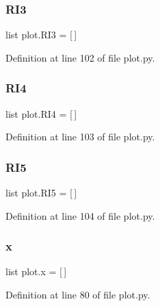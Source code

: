 \subsubsection{R\+I3}
{\footnotesize\ttfamily list plot.\+R\+I3 = [$\,$]}



Definition at line 102 of file plot.\+py.

\mbox{\label{namespaceplot_a668e6067b451a523d880f0be20b5c4a5}} 
\subsubsection{R\+I4}
{\footnotesize\ttfamily list plot.\+R\+I4 = [$\,$]}



Definition at line 103 of file plot.\+py.

\mbox{\label{namespaceplot_a1cf7f0475927bca491f3a888333a898a}} 
\subsubsection{R\+I5}
{\footnotesize\ttfamily list plot.\+R\+I5 = [$\,$]}



Definition at line 104 of file plot.\+py.

\mbox{\label{namespaceplot_af8aab06a27d88dbc584ff449512c109c}} 
\subsubsection{x}
{\footnotesize\ttfamily list plot.\+x = [$\,$]}



Definition at line 80 of file plot.\+py.

